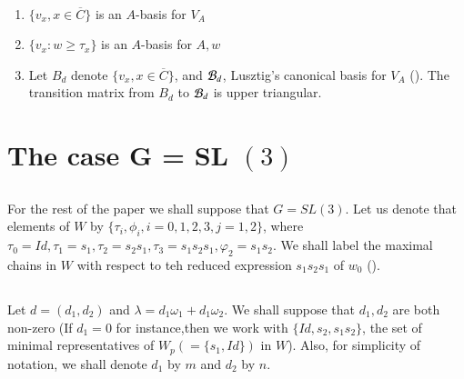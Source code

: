 \setcounter{equation}{14}
\begin{conjectures}\label{art9-conjectures-3.15}
~

\begin{enumerate}[(1)]
 \item $\{ v_{x}, x \in \overline{C}\}$ is an $A$-basis for $V_{A}$

 \item $\{v_{x}: w \geq \tau_{x}\}$ is an $A$-basis for ${A, w}$

 \item Let $B_{d}$ denote $\{v_{x}, x \in \overline{C}\}$, and $\mathcal{B}_{d}$, Lusztig's canonical basis for $V_{A}$ (\cite{art9-keyL2}). The transition matrix from $B_{d}$ to $\mathcal{B}_{d}$ is upper triangular.
\end{enumerate}
\end{conjectures}

\section{The case G = SL $(3)$}\label{art9-sec-4}

\subsection{}\label{art9-subsec-4.1}
For the rest of the paper we shall suppose that $G=SL(3)$. Let us denote that elements of $W$ by $\{\tau_{i}, \phi_{i}, i=0,1,2,3, j=1,2\}$, where $\tau_{0} = Id, \tau_{1} =s_{1}, \tau_{2} =s_{2}s_{1}, \tau_{3} =s_{1}s_{2}s_{1}, \varphi_{2} =s_{1}s_{2}$.  We shall label the maximal chains in $W$ with respect to teh reduced expression $s_{1}s_{2}s_{1}$ of $w_{0}$ (\cite{art9-keyB-W}). 

\subsection{}\label{art9-subsec-4.2}
Let $d=(d_{1}, d_{2})$ and $\lambda = d_{1}\omega_{1} + d_{1}\omega_{2}$. We shall suppose that $d_{1}, d_{2}$ are both non-zero (If $d_{1}=0$ for instance,then we work with $\{Id, s_{2}, s_{1}s_{2}\}$, the set of minimal representatives of $W_{p}(=\{s_{1}, Id\})$ in $W$). Also, for simplicity of notation, we shall denote $d_{1}$ by $m$ and $d_{2}$ by $n$.

\subsection{}\label{art9-subsec-4.3}

